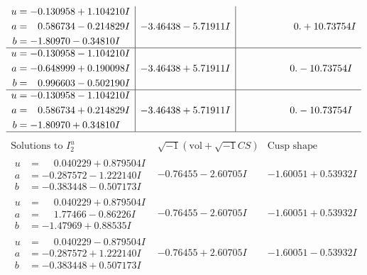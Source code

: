 \documentclass[1p]{elsarticle_modified}
\theoremstyle{definition}
\newcommand{\I}{\sqrt{-1}}
\begin{document}
$$\begin{array}{c|c|c}
\begin{aligned}
u &= -0.130958 + 1.104210 I \\
a &= \phantom{-}0.586734 - 0.214829 I \\
b &= -1.80970 - 0.34810 I\end{aligned}
 & -3.46438 - 5.71911 I & \phantom{-0.000000 -}0. + 10.73754 I \\ \hline\begin{aligned}
u &= -0.130958 - 1.104210 I \\
a &= -0.648999 + 0.190098 I \\
b &= \phantom{-}0.996603 - 0.502190 I\end{aligned}
 & -3.46438 + 5.71911 I & \phantom{-0.000000 } 0. - 10.73754 I \\ \hline\begin{aligned}
u &= -0.130958 - 1.104210 I \\
a &= \phantom{-}0.586734 + 0.214829 I \\
b &= -1.80970 + 0.34810 I\end{aligned}
 & -3.46438 + 5.71911 I & \phantom{-0.000000 } 0. - 10.73754 I\\
 \hline 
 \end{array}$$\newpage$$\begin{array}{c|c|c}  
\text{Solutions to }I^u_{2}& \I (\text{vol} + \sqrt{-1}CS) & \text{Cusp shape}\\
 \hline 
\begin{aligned}
u &= \phantom{-}0.040229 + 0.879504 I \\
a &= -0.287572 - 1.222140 I \\
b &= -0.383448 - 0.507173 I\end{aligned}
 & -0.76455 - 2.60705 I & -1.60051 + 0.53932 I \\ \hline\begin{aligned}
u &= \phantom{-}0.040229 + 0.879504 I \\
a &= \phantom{-}1.77466 - 0.86226 I \\
b &= -1.47969 + 0.88535 I\end{aligned}
 & -0.76455 - 2.60705 I & -1.60051 + 0.53932 I \\ \hline\begin{aligned}
u &= \phantom{-}0.040229 - 0.879504 I \\
a &= -0.287572 + 1.222140 I \\
b &= -0.383448 + 0.507173 I\end{aligned}
 & -0.76455 + 2.60705 I & -1.60051 - 0.53932 I \\ \hline\begin{aligned}

\end{aligned}
\end{array}$$
\end{document}
